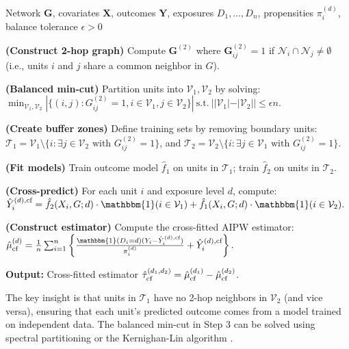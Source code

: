 \documentclass[twoside]{article}
\theoremstyle{plain}
\theoremstyle{definition}
\theoremstyle{remark}
\newcommand{\bY}{\boldsymbol{Y}}
\newcommand{\bG}{\boldsymbol{G}}
\newcommand{\bX}{\boldsymbol{X}}
\newcommand{\cN}{\mathcal{N}}
\newcommand{\indicator}{\mathbbm{1}}
\newcommand{\sumi}{\sum_{i=1}^n}
\begin{document}
\begin{algorithm}[ht!]
    \caption{Graph-Based Cross-Fitting for Network Interference}
    \label{alg:cross_fitting}
\begin{algorithmic}[1]
     Network $\bG$, covariates $\bX$, outcomes $\bY$, exposures $D_1,\ldots,D_n$, propensities $\pi_i^{(d)}$, balance tolerance $\epsilon > 0$

    \STATE \textbf{(Construct 2-hop graph)} Compute $\bG^{(2)}$ where $\bG^{(2)}_{ij} = 1$ if $\cN_i \cap \cN_j \neq \emptyset$ (i.e., units $i$ and $j$ share a common neighbor in $G$).

    \STATE \textbf{(Balanced min-cut)} Partition units into $\mathcal{V}_1, \mathcal{V}_2$ by solving:
    $
    \min_{\mathcal{V}_1, \mathcal{V}_2} |\{(i,j) : G^{(2)}_{ij} = 1, i \in \mathcal{V}_1, j \in \mathcal{V}_2\}| ~ \text{s.t.} ~ ||\mathcal{V}_1| - |\mathcal{V}_2|| \leq \epsilon n.
    $

    \STATE \textbf{(Create buffer zones)} Define training sets by removing boundary units:
    $\mathcal{T}_1 = \mathcal{V}_1 \setminus \{i : \exists j \in \mathcal{V}_2 \text{ with } G^{(2)}_{ij} = 1\}$, and
    $\mathcal{T}_2 = \mathcal{V}_2 \setminus \{i : \exists j \in \mathcal{V}_1 \text{ with } G^{(2)}_{ij} = 1\}$.

    \STATE \textbf{(Fit models)} Train outcome model $\hat{f}_1$ on units in $\mathcal{T}_1$; train $\hat{f}_2$ on units in $\mathcal{T}_2$.

    \STATE \textbf{(Cross-predict)} For each unit $i$ and exposure level $d$, compute:
    $
    \hat{Y}_i^{(d),\textup{cf}} = \hat{f}_2(X_i, G; d) \cdot \indicator(i \in \mathcal{V}_1) + \hat{f}_1(X_i, G; d) \cdot \indicator(i \in \mathcal{V}_2).
    $

    \STATE \textbf{(Construct estimator)} Compute the cross-fitted AIPW estimator:
    $
    \hat{\mu}^{(d)}_{\textup{cf}} = \frac{1}{n}\sumi \left\{ \frac{\indicator(D_i=d)(Y_i - \hat{Y}_i^{(d),\textup{cf}})}{\pi_i^{(d)}} + \hat{Y}_i^{(d),\textup{cf}} \right\}.
    $

    \STATE \textbf{Output:} Cross-fitted estimator $\hat{\tau}^{(d_1,d_2)}_{\textup{cf}} = \hat{\mu}^{(d_1)}_{\textup{cf}} - \hat{\mu}^{(d_2)}_{\textup{cf}}$.
\end{algorithmic}
\end{algorithm}

The key insight is that units in $\mathcal{T}_1$ have no 2-hop neighbors in $\mathcal{V}_2$ (and vice versa), ensuring that each unit's predicted outcome comes from a model trained on independent data. The balanced min-cut in Step 3 can be solved using spectral partitioning \citep{fiedler1973algebraic} or the Kernighan-Lin algorithm \citep{kernighan1970efficient}.
\end{document}
